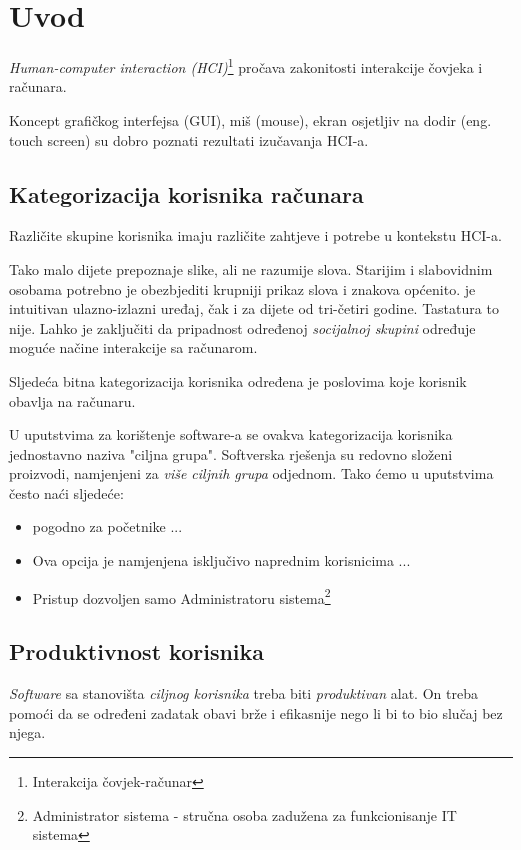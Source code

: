 \documentclass[times, utf8, seminar]{fit}
\begin{document}

\chapter{Uvod}

\emph{Human-computer interaction (HCI)}\footnote{Interakcija čovjek-računar} pročava zakonitosti interakcije čovjeka i računara.

Koncept grafičkog interfejsa (GUI), miš (mouse), ekran osjetljiv na dodir (eng. touch screen) su dobro poznati rezultati izučavanja HCI-a.

\section{Kategorizacija korisnika računara}

Različite skupine korisnika imaju različite zahtjeve i potrebe u kontekstu HCI-a. 

Tako malo dijete prepoznaje slike, ali ne razumije slova. Starijim i slabovidnim osobama potrebno je obezbjediti krupniji prikaz slova i znakova općenito.  je intuitivan ulazno-izlazni uređaj, čak i za dijete od tri-četiri godine. Tastatura to nije. Lahko je zaključiti da pripadnost određenoj \emph{socijalnoj skupini} određuje moguće načine interakcije sa računarom.

Sljedeća bitna kategorizacija korisnika određena je poslovima koje korisnik obavlja na računaru. 

U uputstvima za korištenje software-a se ovakva kategorizacija korisnika jednostavno naziva "ciljna grupa". Softverska rješenja su redovno složeni proizvodi, namjenjeni za \emph{više ciljnih grupa} odjednom. Tako ćemo u uputstvima često naći sljedeće:
\begin{itemize}
  \item pogodno za početnike ...
  \item Ova opcija je namjenjena isključivo naprednim korisnicima ...
  \item Pristup dozvoljen samo Administratoru sistema\footnote{Administrator sistema - stručna osoba zadužena za funkcionisanje IT sistema}
\end{itemize}

\section{Produktivnost korisnika}

\emph{Software} sa stanovišta \emph{ciljnog korisnika} treba biti \emph{produktivan} alat. On treba pomoći da se određeni zadatak obavi brže i efikasnije nego li bi to bio slučaj bez njega.
\end{document}
